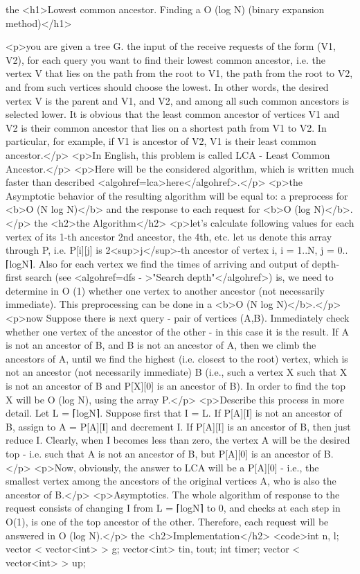 the <h1>Lowest common ancestor. Finding a O (log N) (binary expansion method)</h1>

<p>you are given a tree G. the input of the receive requests of the form (V1, V2), for each query you want to find their lowest common ancestor, i.e. the vertex V that lies on the path from the root to V1, the path from the root to V2, and from such vertices should choose the lowest. In other words, the desired vertex V is the parent and V1, and V2, and among all such common ancestors is selected lower. It is obvious that the least common ancestor of vertices V1 and V2 is their common ancestor that lies on a shortest path from V1 to V2. In particular, for example, if V1 is ancestor of V2, V1 is their least common ancestor.</p>
<p>In English, this problem is called LCA - Least Common Ancestor.</p>
<p>Here will be the considered algorithm, which is written much faster than described <algohref=lca>here</algohref>.</p>
<p>the Asymptotic behavior of the resulting algorithm will be equal to: a preprocess for <b>O (N log N)</b> and the response to each request for <b>O (log N)</b>.</p>
the <h2>the Algorithm</h2>
<p>let's calculate following values for each vertex of its 1-th ancestor 2nd ancestor, the 4th, etc. let us denote this array through P, i.e. P[i][j] is 2<sup>j</sup>-th ancestor of vertex i, i = 1..N, j = 0..⌈logN⌉. Also for each vertex we find the times of arriving and output of depth-first search (see <algohref=dfs - >"Search depth"</algohref>) is, we need to determine in O (1) whether one vertex to another ancestor (not necessarily immediate). This preprocessing can be done in a <b>O (N log N)</b>.</p>
<p>now Suppose there is next query - pair of vertices (A,B). Immediately check whether one vertex of the ancestor of the other - in this case it is the result. If A is not an ancestor of B, and B is not an ancestor of A, then we climb the ancestors of A, until we find the highest (i.e. closest to the root) vertex, which is not an ancestor (not necessarily immediate) B (i.e., such a vertex X such that X is not an ancestor of B and P[X][0] is an ancestor of B). In order to find the top X will be O (log N), using the array P.</p>
<p>Describe this process in more detail. Let L = ⌈logN⌉. Suppose first that I = L. If P[A][I] is not an ancestor of B, assign to A = P[A][I] and decrement I. If P[A][I] is an ancestor of B, then just reduce I. Clearly, when I becomes less than zero, the vertex A will be the desired top - i.e. such that A is not an ancestor of B, but P[A][0] is an ancestor of B.</p>
<p>Now, obviously, the answer to LCA will be a P[A][0] - i.e., the smallest vertex among the ancestors of the original vertices A, who is also the ancestor of B.</p>
<p>Asymptotics. The whole algorithm of response to the request consists of changing I from L = ⌈logN⌉ to 0, and checks at each step in O(1), is one of the top ancestor of the other. Therefore, each request will be answered in O (log N).</p>
the <h2>Implementation</h2>
<code>int n, l;
vector < vector<int> > g;
vector<int> tin, tout;
int timer;
vector < vector<int> > up;


